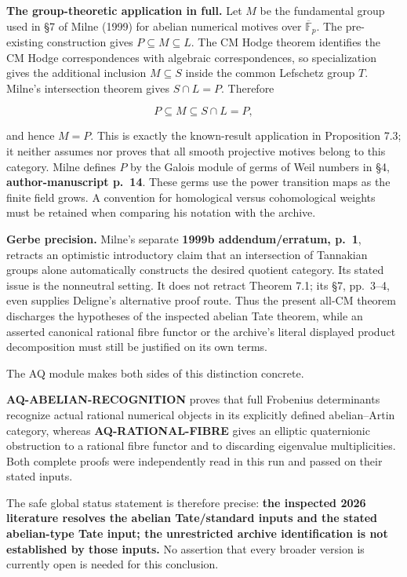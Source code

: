 \documentclass[11pt,a4paper]{article}
\theoremstyle{definition}\newtheorem{definition}[theorem]{Definition}
\theoremstyle{remark}\newtheorem{remark}[theorem]{Remark}
\begin{document}
\textbf{The group-theoretic application in full.} Let \(M\) be the
fundamental group used in §7 of Milne (1999) for abelian numerical
motives over \(\overline{\mathbb F}_p\). The pre-existing construction
gives \(P\subseteq M\subseteq L\). The CM Hodge theorem identifies the
CM Hodge correspondences with algebraic correspondences, so
specialization gives the additional inclusion \(M\subseteq S\) inside
the common Lefschetz group \(T\). Milne's intersection theorem gives
\(S\cap L=P\). Therefore

\[
P\subseteq M\subseteq S\cap L=P,
\]

and hence \(M=P\). This is exactly the known-result application in
Proposition 7.3; it neither assumes nor proves that all smooth
projective motives belong to this category. Milne defines \(P\) by the
Galois module of germs of Weil numbers in §4, \textbf{author-manuscript
p.~14}. These germs use the power transition maps as the finite field
grows. A convention for homological versus cohomological weights must be
retained when comparing his notation with the archive.

\textbf{Gerbe precision.} Milne's separate \textbf{1999b
addendum/erratum, p.~1}, retracts an optimistic introductory claim that
an intersection of Tannakian groups alone automatically constructs the
desired quotient category. Its stated issue is the nonneutral setting.
It does not retract Theorem 7.1; its §7, pp.~3--4, even supplies
Deligne's alternative proof route. Thus the present all-CM theorem
discharges the hypotheses of the inspected abelian Tate theorem, while
an asserted canonical rational fibre functor or the archive's literal
displayed product decomposition must still be justified on its own
terms.

The AQ module makes both sides of this distinction concrete.

\textbf{AQ-ABELIAN-RECOGNITION} proves that full Frobenius determinants
recognize actual rational numerical objects in its explicitly defined
abelian--Artin category, whereas \textbf{AQ-RATIONAL-FIBRE} gives an
elliptic quaternionic obstruction to a rational fibre functor and to
discarding eigenvalue multiplicities. Both complete proofs were
independently read in this run and passed on their stated inputs.

The safe global status statement is therefore precise: \textbf{the
inspected 2026 literature resolves the abelian Tate/standard inputs and
the stated abelian-type Tate input; the unrestricted archive
identification is not established by those inputs.} No assertion that
every broader version is currently open is needed for this conclusion.
\end{document}
